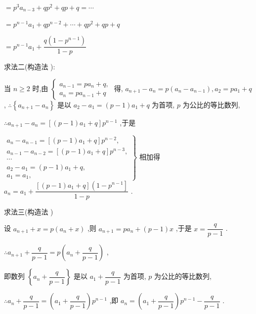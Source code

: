 $= {p}^{3}{a}_{n - 3} + q{p}^{2} + {qp} + q = \cdots$

$= {p}^{n - 1}{a}_{1} + q{p}^{n - 2} + \cdots  + q{p}^{2} + {qp} + q$

$= {p}^{n - 1}{a}_{1} + \dfrac{q\left( {1 - {p}^{n - 1}}\right) }{1 - p}$

求法二(构造法  ):

当 $n \geq  2$ 时,由 $\left\{  \begin{array}{l} {a}_{n - 1} = p{a}_{n} + q, \\  {a}_{n} = p{a}_{n - 1} + q \end{array}\right.$ 得, ${a}_{n + 1} - {a}_{n} = p\left( {{a}_{n} - {a}_{n - 1}}\right) ,{a}_{2} = p{a}_{1} + q$ , $\therefore \left\{  {{a}_{n + 1} - {a}_{n}}\right\}$ 是以 ${a}_{2} - {a}_{1} = \left( {p - 1}\right) {a}_{1} + q$ 为首项, $p$ 为公比的等比数列,

$\therefore {a}_{n + 1} - {a}_{n} = \left\lbrack  {\left( {p - 1}\right) {a}_{1} + q}\right\rbrack  {p}^{n - 1}$ ,于是

$\left. \begin{array}{l} {a}_{n} - {a}_{n - 1} = \left\lbrack  {\left( {p - 1}\right) {a}_{1} + q}\right\rbrack  {p}^{n - 2}, \\  {a}_{n - 1} - {a}_{n - 2} = \left\lbrack  {\left( {p - 1}\right) {a}_{1} + q}\right\rbrack  {p}^{n - 3}, \\  \cdots \\  {a}_{2} - {a}_{1} = \left( {p - 1}\right) {a}_{1} + q, \\  {a}_{1} = {a}_{1}, \end{array}\right\}$ 相加得 ${a}_{n} = {a}_{1} + \dfrac{\left\lbrack  {\left( {p - 1}\right) {a}_{1} + q}\right\rbrack  \left( {1 - {p}^{n - 1}}\right\rbrack  }{1 - p}$ .

求法三(构造法  )

设 ${a}_{n + 1} + x = p\left( {{a}_{n} + x}\right)$ ,则 ${a}_{n + 1} = p{a}_{n} + \left( {p - 1}\right) x$ ,于是 $x = \dfrac{q}{p - 1}$ .

$\therefore {a}_{n + 1} + \dfrac{q}{p - 1} = p\left( {{a}_{n} + \dfrac{q}{p - 1}}\right)$ ,

即数列 $\left\{  {{a}_{n} + \dfrac{q}{p - 1}}\right\}$ 是以 ${a}_{1} + \dfrac{q}{p - 1}$ 为首项, $p$ 为公比的等比数列,

$\therefore {a}_{n} + \dfrac{q}{p - 1} = \left( {{a}_{1} + \dfrac{q}{p - 1}}\right) {p}^{n - 1}$ ,即 ${a}_{n} = \left( {{a}_{1} + \dfrac{q}{p - 1}}\right) {p}^{n - 1} - \dfrac{q}{p - 1}$ .

